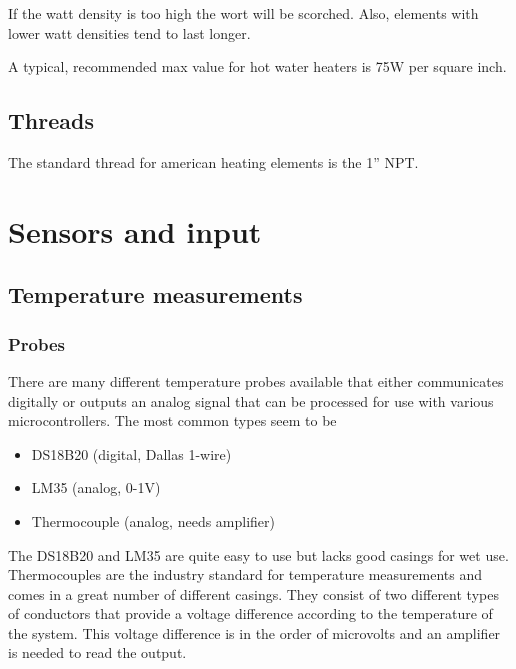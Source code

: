 \documentclass[11pt,fleqn,openany]{book} %
\begin{document}
If the watt density is too high the wort will be scorched. Also, elements with lower watt densities tend to last longer.

A typical, recommended max value for hot water heaters is 75W per square inch.

\section{Threads}

The standard thread for american heating elements is the 1'' NPT.



\chapter{Sensors and input}

\section{Temperature measurements}

\subsection{Probes}

There are many different temperature probes available that either communicates digitally or outputs an analog signal that can be processed for use with various microcontrollers. The most common types seem to be

\begin{itemize}
\item DS18B20 (digital, Dallas 1-wire)
\item LM35 (analog, 0-1V)
\item Thermocouple (analog, needs amplifier)
\end{itemize}

The DS18B20 and LM35 are quite easy to use but lacks good casings for wet use. Thermocouples are the industry standard for temperature measurements and comes in a great number of different casings. They consist of two different types of conductors that provide a voltage difference according to the temperature of the system. This voltage difference is in the order of microvolts and an amplifier is needed to read the output.
\end{document}
